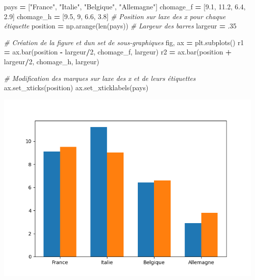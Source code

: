 \documentclass[
  12pt,
]{book}
\newenvironment{Shaded}{\begin{snugshade}}{\end{snugshade}}
\newcommand{\BuiltInTok}[1]{#1}
\newcommand{\CommentTok}[1]{\textcolor[rgb]{0.56,0.35,0.01}{\textit{#1}}}
\newcommand{\DecValTok}[1]{\textcolor[rgb]{0.00,0.00,0.81}{#1}}
\newcommand{\FloatTok}[1]{\textcolor[rgb]{0.00,0.00,0.81}{#1}}
\newcommand{\NormalTok}[1]{#1}
\newcommand{\OperatorTok}[1]{\textcolor[rgb]{0.81,0.36,0.00}{\textbf{#1}}}
\newcommand{\StringTok}[1]{\textcolor[rgb]{0.31,0.60,0.02}{#1}}
\numberwithin{equation}{section}
\numberwithin{countremarque}{section}
\begin{document}
\begin{Shaded}
\begin{Highlighting}[]
\NormalTok{pays }\OperatorTok{=}\NormalTok{ [}\StringTok{"France"}\NormalTok{, }\StringTok{"Italie"}\NormalTok{, }\StringTok{"Belgique"}\NormalTok{, }\StringTok{"Allemagne"}\NormalTok{]}
\NormalTok{chomage\_f }\OperatorTok{=}\NormalTok{ [}\FloatTok{9.1}\NormalTok{, }\FloatTok{11.2}\NormalTok{, }\FloatTok{6.4}\NormalTok{, }\FloatTok{2.9}\NormalTok{]}
\NormalTok{chomage\_h }\OperatorTok{=}\NormalTok{ [}\FloatTok{9.5}\NormalTok{, }\DecValTok{9}\NormalTok{, }\FloatTok{6.6}\NormalTok{, }\FloatTok{3.8}\NormalTok{]}
\CommentTok{\# Position sur l\textquotesingle{}axe des x pour chaque étiquette}
\NormalTok{position }\OperatorTok{=}\NormalTok{ np.arange(}\BuiltInTok{len}\NormalTok{(pays))}
\CommentTok{\# Largeur des barres}
\NormalTok{largeur }\OperatorTok{=} \FloatTok{.35}

\CommentTok{\# Création de la figure et d\textquotesingle{}un set de sous{-}graphiques}
\NormalTok{fig, ax }\OperatorTok{=}\NormalTok{ plt.subplots()}
\NormalTok{r1 }\OperatorTok{=}\NormalTok{ ax.bar(position }\OperatorTok{{-}}\NormalTok{ largeur}\OperatorTok{/}\DecValTok{2}\NormalTok{, chomage\_f, largeur)}
\NormalTok{r2 }\OperatorTok{=}\NormalTok{ ax.bar(position }\OperatorTok{+}\NormalTok{ largeur}\OperatorTok{/}\DecValTok{2}\NormalTok{, chomage\_h, largeur)}

\CommentTok{\# Modification des marques sur l\textquotesingle{}axe des x et de leurs étiquettes}
\NormalTok{ax.set\_xticks(position)}
\NormalTok{ax.set\_xticklabels(pays)}
\end{Highlighting}
\end{Shaded}

\begin{center}\includegraphics[width=9.03in]{figs/pyplot/barplot_mulltiples} \end{center}
\end{document}
